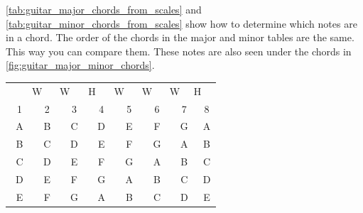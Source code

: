 \autoref{tab:guitar_major_chords_from_scales} and \autoref{tab:guitar_minor_chords_from_scales} show how to determine which notes are in a chord. The order of the chords in the major and minor tables are the same. This way you can compare them. These notes are also seen under the chords in \autoref{fig:guitar_major_minor_chords}.

\begin{table}[h]
	\begin{minipage}{0.45\textwidth}
				\centering
		\begin{tabular}{*{16}{c}}
			& \multicolumn{2}{P{4mm}}{\large{W}} & \multicolumn{2}{P{4mm}}{\large{W}} & \multicolumn{2}{P{4mm}}{\large{H}} & \multicolumn{2}{P{4mm}}{\large{W}} & \multicolumn{2}{P{4mm}}{\large{W}} & \multicolumn{2}{P{4mm}}{\large{W}} & \multicolumn{2}{P{4mm}}{\large{H}} & \\
			\multicolumn{2}{P{4mm}}{1} & \multicolumn{2}{P{4mm}}{2} & \multicolumn{2}{P{4mm}}{3} & \multicolumn{2}{P{4mm}}{4} & \multicolumn{2}{P{4mm}}{5} & \multicolumn{2}{P{4mm}}{6} & \multicolumn{2}{P{4mm}}{7} & \multicolumn{2}{P{4mm}}{8} \\
			\multicolumn{2}{P{4mm}}{\ScaleRootCellFill A} & \multicolumn{2}{P{4mm}}{B} & \multicolumn{2}{P{4mm}}{\ScaleCellFill C\sharp} & \multicolumn{2}{P{4mm}}{D} & \multicolumn{2}{P{4mm}}{\ScaleCellFill E} & \multicolumn{2}{P{4mm}}{F\sharp} & \multicolumn{2}{P{4mm}}{G\sharp} & \multicolumn{2}{P{4mm}}{A} \\
			\multicolumn{2}{P{4mm}}{\ScaleRootCellFill B} & \multicolumn{2}{P{4mm}}{C\sharp} & \multicolumn{2}{P{4mm}}{\ScaleCellFill D\sharp} & \multicolumn{2}{P{4mm}}{E} & \multicolumn{2}{P{4mm}}{\ScaleCellFill F\sharp} & \multicolumn{2}{P{4mm}}{G\sharp} & \multicolumn{2}{P{4mm}}{A\sharp} & \multicolumn{2}{P{4mm}}{B} \\
			\multicolumn{2}{P{4mm}}{\ScaleRootCellFill C} & \multicolumn{2}{P{4mm}}{D} & \multicolumn{2}{P{4mm}}{\ScaleCellFill E} & \multicolumn{2}{P{4mm}}{F} & \multicolumn{2}{P{4mm}}{\ScaleCellFill G} & \multicolumn{2}{P{4mm}}{A} & \multicolumn{2}{P{4mm}}{B} & \multicolumn{2}{P{4mm}}{C} \\
			\multicolumn{2}{P{4mm}}{\ScaleRootCellFill D} & \multicolumn{2}{P{4mm}}{E} & \multicolumn{2}{P{4mm}}{\ScaleCellFill F\sharp} & \multicolumn{2}{P{4mm}}{G} & \multicolumn{2}{P{4mm}}{\ScaleCellFill A} & \multicolumn{2}{P{4mm}}{B} & \multicolumn{2}{P{4mm}}{C\sharp} & \multicolumn{2}{P{4mm}}{D} \\
			\multicolumn{2}{P{4mm}}{\ScaleRootCellFill E} & \multicolumn{2}{P{4mm}}{F\sharp} & \multicolumn{2}{P{4mm}}{\ScaleCellFill G\sharp} & \multicolumn{2}{P{4mm}}{A} & \multicolumn{2}{P{4mm}}{\ScaleCellFill B} & \multicolumn{2}{P{4mm}}{C\sharp} & \multicolumn{2}{P{4mm}}{D\sharp} & \multicolumn{2}{P{4mm}}{E} \\

\end{tabular}
\end{minipage}
\end{table}
